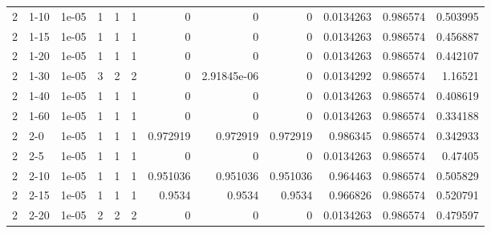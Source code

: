 \begin{tabular}{rlrrrrrrrrrr}
     2 & 1-10   &      1e-05 &           1 &                 1 &                 1 &     0           &     0           &      0           &        0.0134263 &               0.986574 &           0.503995 \\
     2 & 1-15   &      1e-05 &           1 &                 1 &                 1 &     0           &     0           &      0           &        0.0134263 &               0.986574 &           0.456887 \\
     2 & 1-20   &      1e-05 &           1 &                 1 &                 1 &     0           &     0           &      0           &        0.0134263 &               0.986574 &           0.442107 \\
     2 & 1-30   &      1e-05 &           3 &                 2 &                 2 &     0           &     2.91845e-06 &      0           &        0.0134292 &               0.986574 &           1.16521  \\
     2 & 1-40   &      1e-05 &           1 &                 1 &                 1 &     0           &     0           &      0           &        0.0134263 &               0.986574 &           0.408619 \\
     2 & 1-60   &      1e-05 &           1 &                 1 &                 1 &     0           &     0           &      0           &        0.0134263 &               0.986574 &           0.334188 \\
     2 & 2-0    &      1e-05 &           1 &                 1 &                 1 &     0.972919    &     0.972919    &      0.972919    &        0.986345  &               0.986574 &           0.342933 \\
     2 & 2-5    &      1e-05 &           1 &                 1 &                 1 &     0           &     0           &      0           &        0.0134263 &               0.986574 &           0.47405  \\
     2 & 2-10   &      1e-05 &           1 &                 1 &                 1 &     0.951036    &     0.951036    &      0.951036    &        0.964463  &               0.986574 &           0.505829 \\
     2 & 2-15   &      1e-05 &           1 &                 1 &                 1 &     0.9534      &     0.9534      &      0.9534      &        0.966826  &               0.986574 &           0.520791 \\
     2 & 2-20   &      1e-05 &           2 &                 2 &                 2 &     0           &     0           &      0           &        0.0134263 &               0.986574 &           0.479597 \\

\end{tabular}
